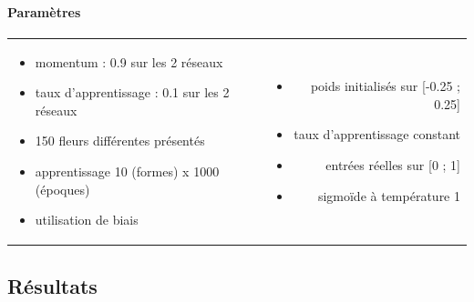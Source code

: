     \paragraph{Paramètres}
      \begin{center}
	\begin{tabular}{lr}
	  \begin{minipage}{230px}
	    \begin{itemize}
	      \item momentum : 0.9 sur les 2 réseaux
	      \item taux d'apprentissage : 0.1 sur les 2 réseaux
	      \item 150 fleurs différentes présentés \cite{Iris}
	      \item apprentissage 10 (formes) x 1000 (époques)
	      \item utilisation de biais
	    \end{itemize}
	  \end{minipage}
	  &
	  \begin{minipage}{230px}
	    \begin{itemize}
	      \item poids initialisés sur [-0.25 ; 0.25]
	      \item taux d'apprentissage constant
	      \item entrées réelles sur [0 ; 1]
	      \item sigmoïde à température 1
	    \end{itemize}
	  \end{minipage}
	\end{tabular}
      \end{center}

  
  \newpage
  \subsection{Résultats}
